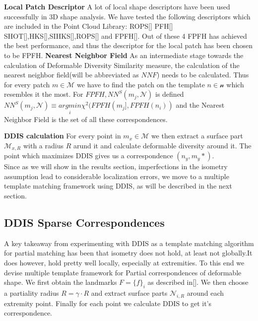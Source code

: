 \documentclass[10pt,twocolumn,letterpaper]{article}
\begin{document}
\textbf{Local Patch Descriptor}
A lot of local shape descriptors have been used successfully in 3D shape analysis. We have tested the following descriptors which are included in the Point Cloud Library: ROPS[\cite[Theorem 2]{Knuth1973}] PFH[] SHOT[],HKS[],SIHKS[],ROPS[] and FPFH[]. Out of these 4 FPFH has achieved the best performance, and thus the descriptor for the local patch has been chosen to be FPFH. 
\textbf{Nearest Neighbor Field}
As an intermediate stage towards the calculation of Deformable Diversity Similarity measure, the calculation of the nearest neighbor field(will be abbreviated as $NNF$) needs to be calculated. Thus for every patch $m\in \mathcal{M}$ we have to find the patch on the template $n\in\mathcal{n}$ which resembles it the most. For $FPFH, NN^S(m_j,\mathcal{N})$ is defined $NN^S (m_j,\mathcal{N}) \equiv \underset{i}{argmin}\chi^2(FPFH(m_j],FPFH(n_i))$ and the Nearest Neighbor Field is the set of all these correspondences.

\textbf{DDIS calculation}
For every point in $m_x\in\mathcal{M}$ we then extract a surface part $\mathcal{M}_{x,R}$ with a radius $R$ arund it and calculate deformable diversity around it. The point which maximizes DDIS gives us a correspondence $(n_y,m_y*)$.\\Since as we will show in the results section, imperfections in the isometry assumption lead to considerable localization errors, we move to a multiple template matching framework using DDIS, as will be described in the next section. 

\subsection{DDIS Sparse Correspondences}
A key takeaway from experimenting with DDIS as a template matching algorithm for partial matching has been that isometry does not hold, at least not globally.It does however, hold pretty well locally, especially at extremities. To this end we devise  multiple template framework for Partial correspondences of deformable shape. We first obtain the landmarks $F=\{f\}_i$ as described in[]. We then choose a partiality radius $R=\gamma\cdot R$ and extract surface parts $\mathcal{N}_{i,R}$ around each extremity point. Finally for each point we calculate DDIS to get it's correspondence.
\end{document}
